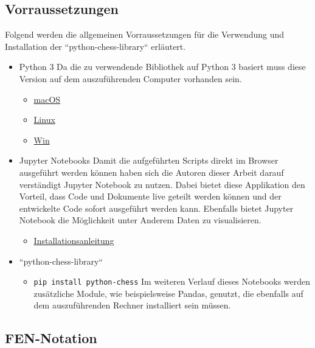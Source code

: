 \subsection{Vorraussetzungen}\label{vorraussetzungen}

Folgend werden die allgemeinen Vorraussetzungen für die Verwendung und
Installation der ``python-chess-library`` erläutert.

\begin{itemize}
\tightlist
\item
  Python 3 Da die zu verwendende Bibliothek auf Python 3 basiert muss
  diese Version auf dem auszuführenden Computer vorhanden sein.

  \begin{itemize}
  \tightlist
  \item
    \href{https://wsvincent.com/install-python3-mac/}{macOS}
  \item
    \href{https://docs.python-guide.org/starting/install3/linux/}{Linux}
  \item
    \href{https://realpython.com/installing-python/}{Win}
  \end{itemize}
\item
  Jupyter Notebooks Damit die aufgeführten Scripts direkt im Browser
  ausgeführt werden können haben sich die Autoren dieser Arbeit darauf
  verständigt Jupyter Notebook zu nutzen. Dabei bietet diese Applikation
  den Vorteil, dass Code und Dokumente live geteilt werden können und
  der entwickelte Code sofort ausgeführt werden kann. Ebenfalls bietet
  Jupyter Notebook die Möglichkeit unter Anderem Daten zu visualisieren.

  \begin{itemize}
  \tightlist
  \item
    \href{https://jupyter.org/install}{Installationsanleitung}
  \end{itemize}
\item
  ``python-chess-library``

  \begin{itemize}
  \tightlist
  \item
    \texttt{pip\ install\ python-chess} Im weiteren Verlauf dieses
    Notebooks werden zusätzliche Module, wie beispielsweise Pandas,
    genutzt, die ebenfalls auf dem auszuführenden Rechner installiert
    sein müssen.
  \end{itemize}
\end{itemize}

\subsection{FEN-Notation}\label{FEN-Notation}

